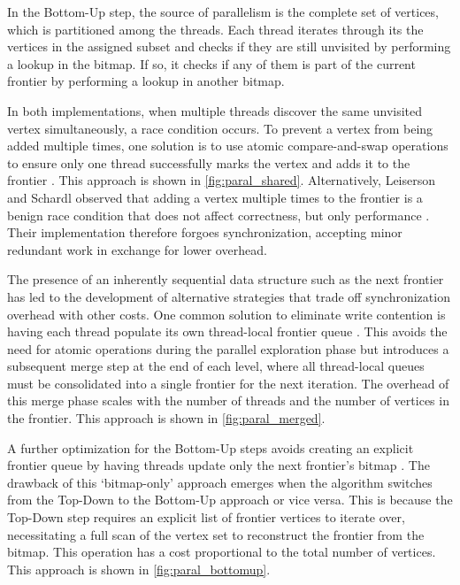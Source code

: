 In the Bottom-Up step, the source of parallelism is the complete set of vertices, which is partitioned among the threads. Each thread iterates through its the vertices in the assigned subset and checks if they are still unvisited by performing a lookup in the bitmap. If so, it checks if any of them is part of the current frontier by performing a lookup in another bitmap.

In both implementations, when multiple threads discover the same unvisited vertex simultaneously, a race condition occurs. To prevent a vertex from being added multiple times, one solution is to use atomic compare-and-swap operations to ensure only one thread successfully marks the vertex and adds it to the frontier \cite{beamer2013direction}. This approach is shown in \cref{fig:paral_shared}. Alternatively, Leiserson and Schardl observed that adding a vertex multiple times to the frontier is a benign race condition that does not affect correctness, but only performance \cite{leiserson2010work}. Their implementation therefore forgoes synchronization, accepting minor redundant work in exchange for lower overhead.

The presence of an inherently sequential data structure such as the next frontier has led to the development of alternative strategies that trade off synchronization overhead with other costs. One common solution to eliminate write contention is having each thread populate its own thread-local frontier queue \cite{beamer2013direction, leiserson2010work}. This avoids the need for atomic operations during the parallel exploration phase but introduces a subsequent merge step at the end of each level, where all thread-local queues must be consolidated into a single frontier for the next iteration. The overhead of this merge phase scales with the number of threads and the number of vertices in the frontier. This approach is shown in \cref{fig:paral_merged}.

A further optimization for the Bottom-Up steps avoids creating an explicit frontier queue by having threads update only the next frontier's bitmap \cite{andaloro2025cache}. The drawback of this `bitmap-only' approach emerges when the algorithm switches from the Top-Down to the Bottom-Up approach or vice versa. This is because the Top-Down step requires an explicit list of frontier vertices to iterate over, necessitating a full scan of the vertex set to reconstruct the frontier from the bitmap. This operation has a cost proportional to the total number of vertices. This approach is shown in \cref{fig:paral_bottomup}.

